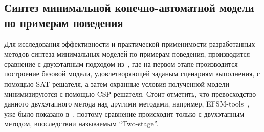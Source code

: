 

\subsection{Синтез минимальной конечно-автоматной модели по примерам поведения}%
\label{sub:exp-mono-pnp-scenarios-only}

Для исследования эффективности и практической применимости разработанных методов синтеза минимальных моделей по примерам поведения, производится сравнение с двухэтапным подходом из~\cite{chivilikhin-19}, где на первом этапе производится построение базовой модели, удовлетворяющей заданым сценариям выполнения, с помощью SAT-решателя, а затем охранные условия полученной модели минимизируются с помощью CSP-решателя.
Стоит отметить, что превосходство данного двухэтапного метода над другими методами, например, EFSM-tools~\cite{efsm-tools}, уже было показано в~\cite{chivilikhin-19}, поэтому сравнение происходит только с двухэтапным методом, впоследствии называемым \enquote{Two-stage}.

\begin{table}
    \centering
    \caption{Результаты синтеза минимальной конечно-автоматной модели логического контроллера PnP\-/манипулятора по примерам поведения с помощью двухэтапного метода Two-stage~\cite{chivilikhin-19} и алгоритма $\AlgoExtendedMinUB$}%
    \label{tab:results-monolith-pnp-extminub}
    
\end{table}

